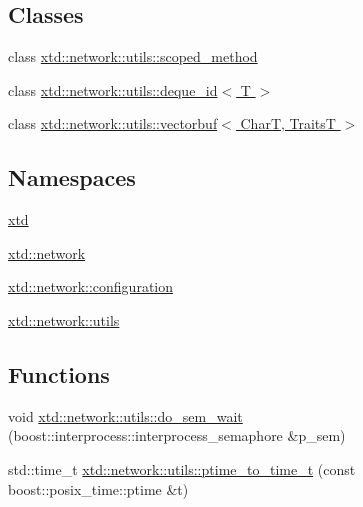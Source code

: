 \subsection*{Classes}
\begin{DoxyCompactItemize}
\item 
class \hyperlink{classxtd_1_1network_1_1utils_1_1scoped__method}{xtd\-::network\-::utils\-::scoped\-\_\-method}
\item 
class \hyperlink{classxtd_1_1network_1_1utils_1_1deque__id}{xtd\-::network\-::utils\-::deque\-\_\-id$<$ T $>$}
\item 
class \hyperlink{classxtd_1_1network_1_1utils_1_1vectorbuf}{xtd\-::network\-::utils\-::vectorbuf$<$ Char\-T, Traits\-T $>$}
\end{DoxyCompactItemize}
\subsection*{Namespaces}
\begin{DoxyCompactItemize}
\item 
\hyperlink{namespacextd}{xtd}
\item 
\hyperlink{namespacextd_1_1network}{xtd\-::network}
\item 
\hyperlink{namespacextd_1_1network_1_1configuration}{xtd\-::network\-::configuration}
\item 
\hyperlink{namespacextd_1_1network_1_1utils}{xtd\-::network\-::utils}
\end{DoxyCompactItemize}
\subsection*{Functions}
\begin{DoxyCompactItemize}
\item 
void \hyperlink{namespacextd_1_1network_1_1utils_a181758eb475ef5f4aebfec6c0ebec0c5}{xtd\-::network\-::utils\-::do\-\_\-sem\-\_\-wait} (boost\-::interprocess\-::interprocess\-\_\-semaphore \&p\-\_\-sem)
\item 
std\-::time\-\_\-t \hyperlink{namespacextd_1_1network_1_1utils_aeee4bc5a0636807dd491f21938b7a1ca}{xtd\-::network\-::utils\-::ptime\-\_\-to\-\_\-time\-\_\-t} (const boost\-::posix\-\_\-time\-::ptime \&t)
\end{DoxyCompactItemize}
